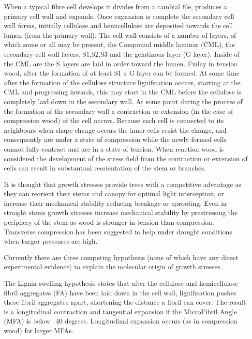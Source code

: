 \documentclass{article}
\begin{document}
When a typical fibre cell develops it divides from a cambial file, produces a
primary cell wall and expands. Once expansion is complete the secondary
cell wall forms, initially cellulose and hemicellulose are deposited towards
the cell lumen (from the primary wall). The cell wall consists of a number of
layers, of which some or all may be present, the Compound middle laminar (CML),
the secondary cell wall layers; S1,S2,S3 and the gelatinous layer (G layer).
Inside of the CML are the S layers are laid in order toward the lumen. Finlay
in tension wood, after the formation of at least S1 a G layer can be formed. At
some time after the formation of the cellulose structure lignification occurs,
starting at the CML and progressing inwards, this may start in the CML before
the cellulose is completely laid down in the secondary wall. At some point during
the process of the formation of the secondary wall a contraction or extension (in
the case of compression wood) of the cell occurs. Because each cell is connected
to its neighbours when shape change occurs the inner cells resist the change, and
consequently are under a state of compression while the newly formed cells
cannot fully contract and are in a state of tension. When reaction wood is
considered the development of the stress field from the contraction or
extension of cells can result in substantual reorientation of the stem or branches.

It is thought that growth stresses provide trees with a competitive
advantage as they can reorient their stems and canopy for optimal light
interception, or increase their mechanical stability reducing breakage or
uprooting. Even in straight stems growth stresses increase mechanical stability
by prestressing the periphery of the stem as wood is stronger in tension than
compression. Transverse compression has been suggested to help under drought
conditions when turgor pressures are high.

Currently there are three competing hypothesis (none of which have any direct
experimental evidence) to explain the molecular origin of growth stresses.

The Lignin swelling hypothesis states that after the cellulose and hemicellulose
fibril aggregates (FA) have been laid down in the cell wall, lignification
pushes these fibril aggregates apart, shortening the distance a fibril can
cover. The result is a longitudinal contraction and tangential expansion if the
MicroFibril Angle (MFA) is below ~40 degrees. Longitudinal expansion occurs
(as in compression wood) for larger MFAs.
\end{document}
